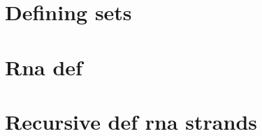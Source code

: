 
\section*{Defining sets}

\vfill
\section*{Rna def}

\vfill
\section*{Recursive def rna strands}

\vfill
